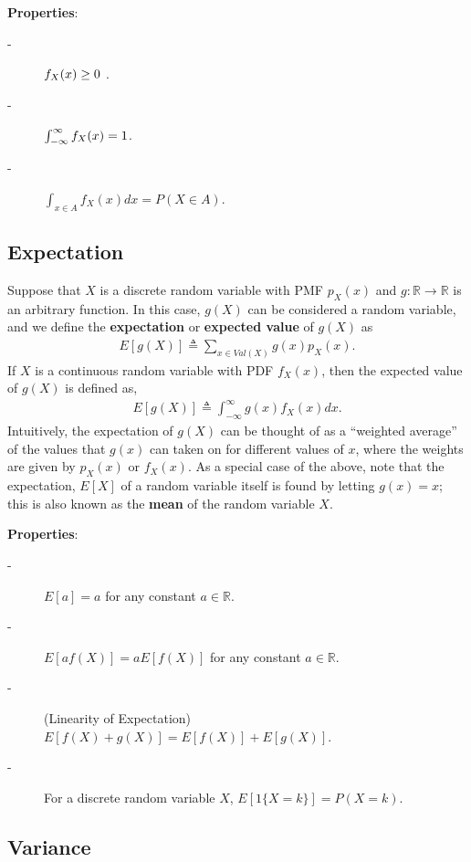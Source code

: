 \documentclass{article}
\begin{document}
\textbf{Properties}:
\begin{description}
\item [-] $\small{f_X(x) \geq 0}$ .
\item [-] $\small {\int_{-\infty}^\infty f_X(x) =1}$.
\item [-] $\int_{x \in A} f_X(x) dx = P(X \in A)$.
\end{description}

\subsection{Expectation}
Suppose that $X$ is a discrete random variable with PMF $p_X(x)$ and $g: \mathbb{R} \longrightarrow \mathbb{R}$ is an arbitrary function. In this case,
$g(X)$ can be considered a random variable, and we define the \textbf{expectation} or \textbf{expected value} of $g(X)$ as
\begin{align*}
E[g(X)] \triangleq \sum_{x \in Val(X)} g(x) p_X(x).
\end{align*}
If $X$ is a continuous random variable with PDF $f_X(x)$, then the expected value of $g(X)$ is defined as,
\begin{align*}
E[g(X)]\triangleq \int_{-\infty}^{\infty} g(x) f_X(x) dx.
\end{align*}
Intuitively, the expectation of $g(X)$ can be thought of as a ``weighted average'' of
the values that $g(x)$ can taken on for different values of $x$, where the weights are
given by $p_X(x)$ or $f_X(x)$.
As a special case of the above, note that the expectation, $E[X]$ of a random variable itself
is found by letting $g(x) = x$; this is also known as the \textbf{mean} of the random variable $X$.

\textbf{Properties}:
\begin{description}
\item[-] $E[a] = a$ for any constant $a \in \mathbb{R}$.
\item[-] $E[af(X)] = aE[f(X)]$ for any constant $a \in \mathbb{R}$.
\item[-] (Linearity of Expectation) $E[f(X) + g(X)] = E[f(X)] + E[g(X)]$.
\item[-] For a discrete random variable $X$, $E[1\{X = k \}] = P(X = k)$.
\end{description}

\subsection{Variance}
\end{document}
